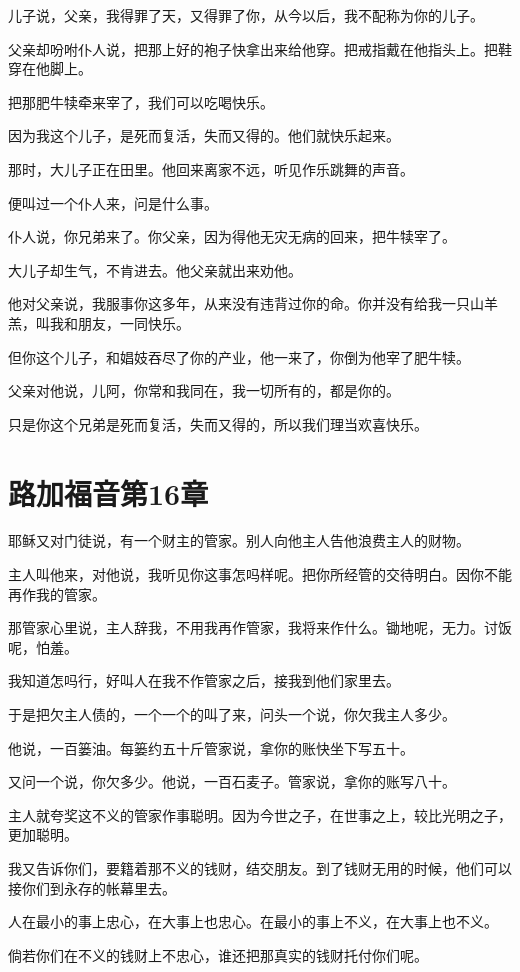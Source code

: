 \documentclass[12pt,oneside]{book}
\begin{document}
儿子说，父亲，我得罪了天，又得罪了你，从今以后，我不配称为你的儿子。

父亲却吩咐仆人说，把那上好的袍子快拿出来给他穿。把戒指戴在他指头上。把鞋穿在他脚上。

把那肥牛犊牵来宰了，我们可以吃喝快乐。

因为我这个儿子，是死而复活，失而又得的。他们就快乐起来。

那时，大儿子正在田里。他回来离家不远，听见作乐跳舞的声音。

便叫过一个仆人来，问是什么事。

仆人说，你兄弟来了。你父亲，因为得他无灾无病的回来，把牛犊宰了。

大儿子却生气，不肯进去。他父亲就出来劝他。

他对父亲说，我服事你这多年，从来没有违背过你的命。你并没有给我一只山羊羔，叫我和朋友，一同快乐。

但你这个儿子，和娼妓吞尽了你的产业，他一来了，你倒为他宰了肥牛犊。

父亲对他说，儿阿，你常和我同在，我一切所有的，都是你的。

只是你这个兄弟是死而复活，失而又得的，所以我们理当欢喜快乐。

\chapter{路加福音第16章}
耶稣又对门徒说，有一个财主的管家。别人向他主人告他浪费主人的财物。

主人叫他来，对他说，我听见你这事怎吗样呢。把你所经管的交待明白。因你不能再作我的管家。

那管家心里说，主人辞我，不用我再作管家，我将来作什么。锄地呢，无力。讨饭呢，怕羞。

我知道怎吗行，好叫人在我不作管家之后，接我到他们家里去。

于是把欠主人债的，一个一个的叫了来，问头一个说，你欠我主人多少。

他说，一百篓油。每篓约五十斤管家说，拿你的账快坐下写五十。

又问一个说，你欠多少。他说，一百石麦子。管家说，拿你的账写八十。

主人就夸奖这不义的管家作事聪明。因为今世之子，在世事之上，较比光明之子，更加聪明。

我又告诉你们，要籍着那不义的钱财，结交朋友。到了钱财无用的时候，他们可以接你们到永存的帐幕里去。

人在最小的事上忠心，在大事上也忠心。在最小的事上不义，在大事上也不义。

倘若你们在不义的钱财上不忠心，谁还把那真实的钱财托付你们呢。
\end{document}
